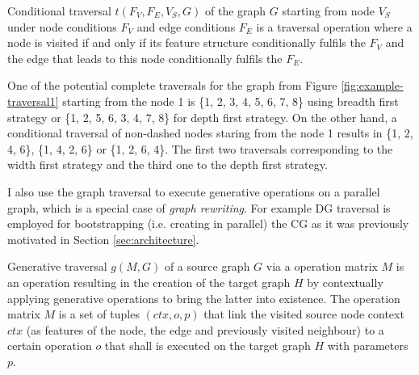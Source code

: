 
\begin{definition}\label{def:conditional-traversal}
    Conditional traversal $t(F_V,F_E,V_S,G)$ of the graph $G$ starting from node $V_S$ under node conditions $F_V$ and edge conditions $F_E$ is a traversal operation where a node is visited if and only if its feature structure conditionally fulfils the $F_V$ and the edge that leads to this node conditionally fulfils the $F_E$.
\end{definition}

One of the potential complete traversals for the graph from Figure \ref{fig:example-traversal1} starting from the node 1 is \{1, 2, 3, 4, 5, 6, 7, 8\} using breadth first strategy or \{1, 2, 5, 6, 3, 4, 7, 8\} for depth first strategy. On the other hand, a conditional traversal of non-dashed nodes staring from the node 1 results in \{1, 2, 4, 6\}, \{1, 4, 2, 6\} or \{1, 2, 6, 4\}. The first two traversals corresponding to the width first strategy and the third one to the depth first strategy. 

I also use the graph traversal to execute generative operations on a parallel graph, which is a special case of \textit{graph rewriting}. For example DG traversal is employed for bootstrapping (i.e. creating in parallel) the CG as it was previously motivated in Section \ref{sec:architecture}.

\begin{definition}\label{def:generative-traversal}
    Generative traversal $g(M,G)$ of a source graph $G$ via a operation matrix $M$ is an operation resulting in the creation of the target graph $H$ by contextually applying generative operations to bring the latter into existence. The operation matrix $M$ is a set of tuples $(ctx,o,p)$ that link the visited source node context $ctx$ (as features of the node, the edge and previously visited neighbour) to a certain operation $o$ that shall is executed on the target graph $H$ with parameters $p$.
\end{definition}


